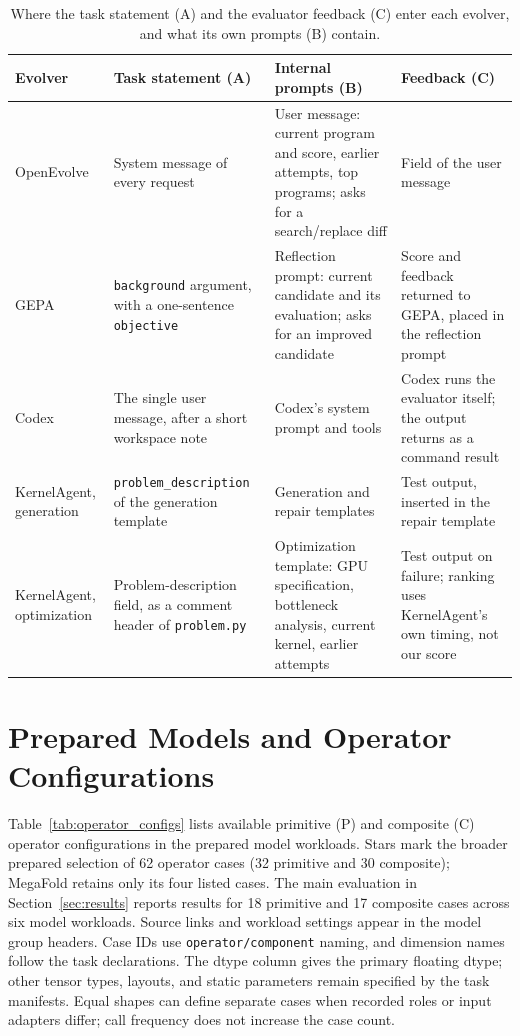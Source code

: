 \begin{table}[h]
\centering
\small
\caption{Where the task statement (A) and the evaluator feedback (C) enter each evolver, and what its own prompts (B) contain.}
\label{tab:prompt-placement}
\begin{tabularx}{\linewidth}{@{}lXXX@{}}
\toprule
Evolver & Task statement (A) & Internal prompts (B) & Feedback (C) \\
\midrule
OpenEvolve & System message of every request & User message: current program and score, earlier attempts, top programs; asks for a search/replace diff & Field of the user message \\
GEPA & \texttt{background} argument, with a one-sentence \texttt{objective} & Reflection prompt: current candidate and its evaluation; asks for an improved candidate & Score and feedback returned to GEPA, placed in the reflection prompt \\
Codex & The single user message, after a short workspace note & Codex's system prompt and tools & Codex runs the evaluator itself; the output returns as a command result \\
KernelAgent, generation & \texttt{problem\_description} of the generation template & Generation and repair templates & Test output, inserted in the repair template \\
KernelAgent, optimization & Problem-description field, as a comment header of \texttt{problem.py} & Optimization template: GPU specification, bottleneck analysis, current kernel, earlier attempts & Test output on failure; ranking uses KernelAgent's own timing, not our score \\
\bottomrule
\end{tabularx}
\end{table}


\section{Prepared Models and Operator Configurations}
\label{app:operator_configs}

Table~\ref{tab:operator_configs} lists available primitive (P) and composite (C) operator configurations in the prepared model workloads. Stars mark the broader prepared selection of 62 operator cases (32 primitive and 30 composite); MegaFold retains only its four listed cases. The main evaluation in Section~\ref{sec:results} reports results for 18 primitive and 17 composite cases across six model workloads. Source links and workload settings appear in the model group headers. Case IDs use \texttt{operator/component} naming, and dimension names follow the task declarations. The dtype column gives the primary floating dtype; other tensor types, layouts, and static parameters remain specified by the task manifests. Equal shapes can define separate cases when recorded roles or input adapters differ; call frequency does not increase the case count.


